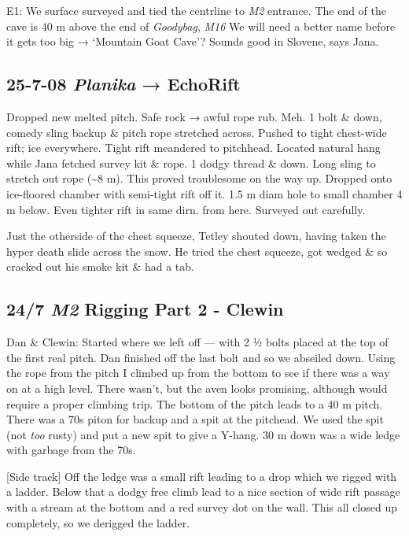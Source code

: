 E1: We surface surveyed and tied the centrline to \emph{M2} entrance.
The end of the cave is 40 m above the end of \emph{Goodybag}, \emph{M16}
We will need a better name before it gets too big → `Mountain Goat
Cave'? Sounds good in Slovene, says Jana.



\subsection{\texorpdfstring{25-7-08 \emph{Planika} →
EchoRift}{25-7-08 Planika → EchoRift}}

Dropped new melted pitch. Safe rock → awful rope rub. Meh. 1 bolt \&
down, comedy sling backup \& pitch rope stretched across. Pushed to
tight chest-wide rift; ice everywhere. Tight rift meandered to
pitchhead. Located natural hang while Jana fetched survey kit \& rope. 1
dodgy thread \& down. Long sling to stretch out rope (\textasciitilde8
m). This proved troublesome on the way up. Dropped onto ice-floored
chamber with semi-tight rift off it. 1.5 m diam hole to small chamber 4
m below. Even tighter rift in same dirn. from here. Surveyed out
carefully.

Just the otherside of the chest squeeze, Tetley shouted down, having
taken the hyper death slide across the snow. He tried the chest squeeze,
got wedged \& so cracked out his smoke kit \& had a tab.


\subsection{\texorpdfstring{24/7 \emph{M2} Rigging Part 2 -
Clewin}{24/7 M2 Rigging Part 2 - Clewin}}

Dan \& Clewin: Started where we left off --- with 2 ½ bolts placed at
the top of the first real pitch. Dan finished off the last bolt and so
we abseiled down. Using the rope from the pitch I climbed up from the
bottom to see if there was a way on at a high level. There wasn't, but
the aven looks promising, although would require a proper climbing trip.
The bottom of the pitch leads to a 40 m pitch. There was a 70s piton for
backup and a spit at the pitchead. We used the spit (not \emph{too}
rusty) and put a new spit to give a Y-hang. 30 m down was a wide ledge
with garbage from the 70s.

{[}Side track{]} Off the ledge was a small rift leading to a drop which
we rigged with a ladder. Below that a dodgy free climb lead to a nice
section of wide rift passage with a stream at the bottom and a red
survey dot on the wall. This all closed up completely, so we derigged
the ladder.


